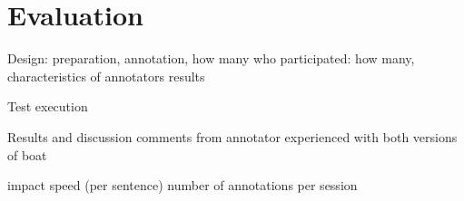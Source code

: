 \section{Evaluation}
\label{sec:evaluation}

Design: preparation, annotation, how many
who participated: how many, characteristics of annotators
results

Test execution

Results and discussion
comments from annotator experienced with both versions of boat

impact
speed (per sentence)
number of annotations per session


